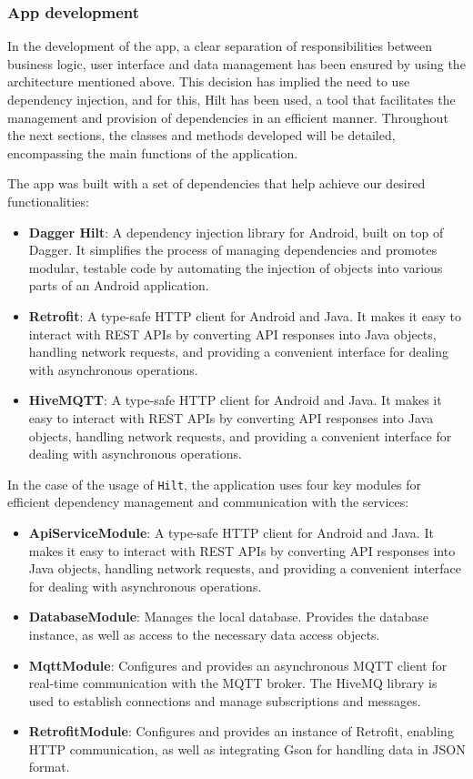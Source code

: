 \subsubsection*{App development}
In the development of the app, a clear separation of responsibilities between business logic, user interface and data management 
has been ensured by using the architecture mentioned above. This decision has implied the need to use dependency injection, and for this, Hilt has been used, 
a tool that facilitates the management and provision of dependencies in an efficient manner. 
Throughout the next sections, the classes and methods developed will be detailed, encompassing the main functions of the application.

\clearpage
The app was built with a set of dependencies that help achieve our desired functionalities:
\begin{itemize}
    \item \textbf{Dagger Hilt}: A dependency injection library for Android, built on top of Dagger. 
    It simplifies the process of managing dependencies and promotes modular, testable code by automating 
    the injection of objects into various parts of an Android application.
    \item \textbf{Retrofit}: A type-safe HTTP client for Android and Java. It makes it easy to interact with REST 
    APIs by converting API responses into Java objects, handling network requests, and providing a convenient 
    interface for dealing with asynchronous operations.
    \item \textbf{HiveMQTT}: A type-safe HTTP client for Android and Java. It makes it easy to interact with REST APIs 
    by converting API responses into Java objects, handling network requests, and providing a convenient interface for 
    dealing with asynchronous operations.
\end{itemize}

In the case of the usage of \texttt{Hilt}, the application uses four key modules for efficient dependency management and 
communication with the services:
\begin{itemize}
    \item \textbf{ApiServiceModule}: A type-safe HTTP client for Android and Java. It makes it easy to interact with REST APIs by converting API responses into Java objects, handling network requests, and providing a convenient interface for dealing with asynchronous operations.
    \item \textbf{DatabaseModule}: Manages the local database. Provides the database instance, as well as access to the necessary data access objects.
    \item \textbf{MqttModule}: Configures and provides an asynchronous MQTT client for real-time communication with the MQTT broker. The HiveMQ library is used to establish connections and manage subscriptions and messages. 
    \item \textbf{RetrofitModule}: Configures and provides an instance of Retrofit, enabling HTTP communication, as well as integrating Gson for handling data in JSON format. 
\end{itemize}

